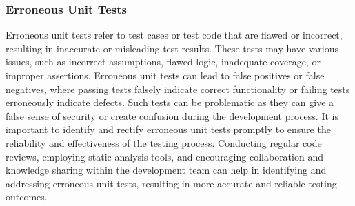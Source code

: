 \subsubsection*{Erroneous Unit Tests}

Erroneous unit tests refer to test cases or test code that are flawed or incorrect, resulting in inaccurate or misleading test results. These tests may have various issues, such as incorrect assumptions, flawed logic, inadequate coverage, or improper assertions. Erroneous 
unit tests can lead to false positives or false negatives, where passing tests falsely indicate correct functionality or failing tests erroneously indicate defects. Such tests can be problematic as they can give a false sense of security or create confusion during the development 
process. It is important to identify and rectify erroneous unit tests promptly to ensure the reliability and effectiveness of the testing process. Conducting regular code reviews, employing static analysis tools, and encouraging collaboration and knowledge sharing within the 
development team can help in identifying and addressing erroneous unit tests, resulting in more accurate and reliable testing outcomes.


